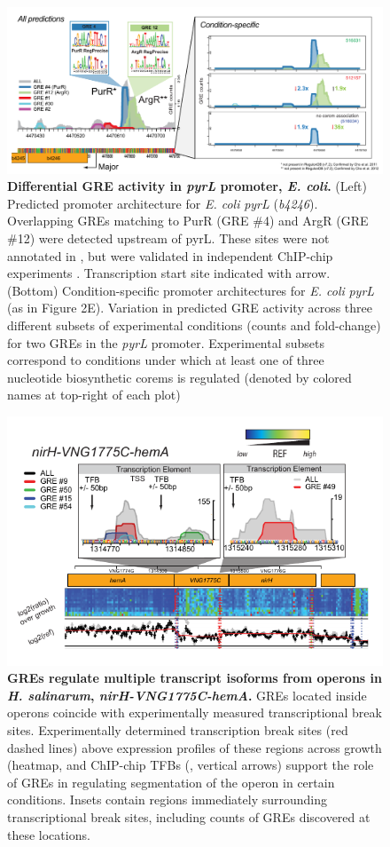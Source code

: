 \begin{figure}[h!]
\centering
\includegraphics[width=0.95\linewidth]{figures/pyrL.pdf}
\caption[Differential GRE activity in \textit{pyrL} promoter, \textit{E. coli}]{\textbf{Differential GRE activity in \textit{pyrL} promoter, \textit{E. coli}.} (Left) Predicted promoter architecture for {\it E. coli} \textit{pyrL} (\textit{b4246}). Overlapping GREs matching to PurR (GRE \#4) and ArgR (GRE \#12) were detected upstream of pyrL. These sites were not annotated in \rdb, but were validated in independent ChIP-chip experiments \cite{Cho2012,Cho2011a}. Transcription start site indicated with arrow. (Bottom) Condition-specific promoter architectures for {\it E. coli} \textit{pyrL} (as in Figure 2E). Variation in predicted GRE activity across three different subsets of experimental conditions (counts and fold-change) for two GREs in the \textit{pyrL} promoter. Experimental subsets correspond to conditions under which at least one of three nucleotide biosynthetic corems is regulated (denoted by colored names at top-right of each plot)}
\label{fig:pyrL}
\end{figure}

\begin{figure}[h!]
\centering
\includegraphics[width=0.6\linewidth]{figures/nirH.pdf}
\caption[GREs regulate multiple transcript isoforms from operons in {\it H. salinarum}, \textit{nirH-VNG1775C-hemA}.]{\textbf{GREs regulate multiple transcript isoforms from operons in {\it H. salinarum}, \textit{nirH-VNG1775C-hemA}.} GREs located inside operons coincide with experimentally measured transcriptional break sites. Experimentally determined transcription break sites (red dashed lines) above expression profiles of these regions across growth (heatmap, \cite{Koide2009} and ChIP-chip TFBs (\cite{Facciotti2007}, vertical arrows) support the role of GREs in regulating segmentation of the operon in certain conditions. Insets contain regions immediately surrounding transcriptional break sites, including counts of GREs discovered at these locations.}
\label{fig:nirH}
\end{figure}

